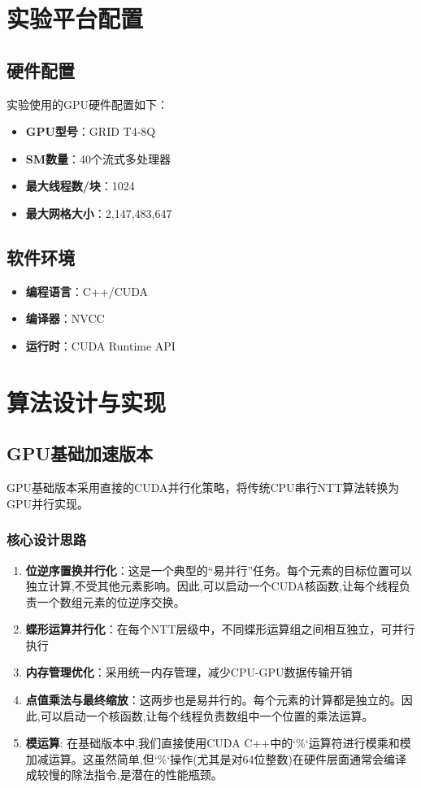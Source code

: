 \documentclass[a4paper]{article}
\begin{document}
\section{实验平台配置}

\subsection{硬件配置}
实验使用的GPU硬件配置如下：
\begin{itemize}
	\item \textbf{GPU型号}：GRID T4-8Q
	\item \textbf{SM数量}：40个流式多处理器
	\item \textbf{最大线程数/块}：1024
	\item \textbf{最大网格大小}：2,147,483,647
\end{itemize}

\subsection{软件环境}
\begin{itemize}
	\item \textbf{编程语言}：C++/CUDA
	\item \textbf{编译器}：NVCC
	\item \textbf{运行时}：CUDA Runtime API
\end{itemize}

\section{算法设计与实现}

\subsection{GPU基础加速版本}

GPU基础版本采用直接的CUDA并行化策略，将传统CPU串行NTT算法转换为GPU并行实现。

\subsubsection{核心设计思路}
\begin{enumerate}
	\item \textbf{位逆序置换并行化}：这是一个典型的“易并行”任务。每个元素的目标位置可以独立计算,不受其他元素影响。因此,可以启动一个CUDA核函数,让每个线程负责一个数组元素的位逆序交换。
	\item \textbf{蝶形运算并行化}：在每个NTT层级中，不同蝶形运算组之间相互独立，可并行执行
	\item \textbf{内存管理优化}：采用统一内存管理，减少CPU-GPU数据传输开销
	\item \textbf{点值乘法与最终缩放}：这两步也是易并行的。每个元素的计算都是独立的。因此,可以启动一个核函数,让每个线程负责数组中一个位置的乘法运算。
	\item \textbf{模运算}: 在基础版本中,我们直接使用CUDA C++中的`\%`运算符进行模乘和模加减运算。这虽然简单,但`\%`操作(尤其是对64位整数)在硬件层面通常会编译成较慢的除法指令,是潜在的性能瓶颈。
\end{enumerate}
\end{document}
